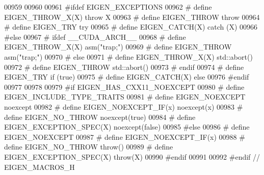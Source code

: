 \begin{DoxyCode}
00959 
00960 
00961 \textcolor{preprocessor}{#ifdef EIGEN\_EXCEPTIONS}
00962 \textcolor{preprocessor}{#  define EIGEN\_THROW\_X(X) throw X}
00963 \textcolor{preprocessor}{#  define EIGEN\_THROW throw}
00964 \textcolor{preprocessor}{#  define EIGEN\_TRY try}
00965 \textcolor{preprocessor}{#  define EIGEN\_CATCH(X) catch (X)}
00966 \textcolor{preprocessor}{#else}
00967 \textcolor{preprocessor}{#  ifdef \_\_CUDA\_ARCH\_\_}
00968 \textcolor{preprocessor}{#    define EIGEN\_THROW\_X(X) asm("trap;")}
00969 \textcolor{preprocessor}{#    define EIGEN\_THROW asm("trap;")}
00970 \textcolor{preprocessor}{#  else}
00971 \textcolor{preprocessor}{#    define EIGEN\_THROW\_X(X) std::abort()}
00972 \textcolor{preprocessor}{#    define EIGEN\_THROW std::abort()}
00973 \textcolor{preprocessor}{#  endif}
00974 \textcolor{preprocessor}{#  define EIGEN\_TRY if (true)}
00975 \textcolor{preprocessor}{#  define EIGEN\_CATCH(X) else}
00976 \textcolor{preprocessor}{#endif}
00977 
00978 
00979 \textcolor{preprocessor}{#if EIGEN\_HAS\_CXX11\_NOEXCEPT}
00980 \textcolor{preprocessor}{#   define EIGEN\_INCLUDE\_TYPE\_TRAITS}
00981 \textcolor{preprocessor}{#   define EIGEN\_NOEXCEPT noexcept}
00982 \textcolor{preprocessor}{#   define EIGEN\_NOEXCEPT\_IF(x) noexcept(x)}
00983 \textcolor{preprocessor}{#   define EIGEN\_NO\_THROW noexcept(true)}
00984 \textcolor{preprocessor}{#   define EIGEN\_EXCEPTION\_SPEC(X) noexcept(false)}
00985 \textcolor{preprocessor}{#else}
00986 \textcolor{preprocessor}{#   define EIGEN\_NOEXCEPT}
00987 \textcolor{preprocessor}{#   define EIGEN\_NOEXCEPT\_IF(x)}
00988 \textcolor{preprocessor}{#   define EIGEN\_NO\_THROW throw()}
00989 \textcolor{preprocessor}{#   define EIGEN\_EXCEPTION\_SPEC(X) throw(X)}
00990 \textcolor{preprocessor}{#endif}
00991 
00992 \textcolor{preprocessor}{#endif // EIGEN\_MACROS\_H}
\end{DoxyCode}
